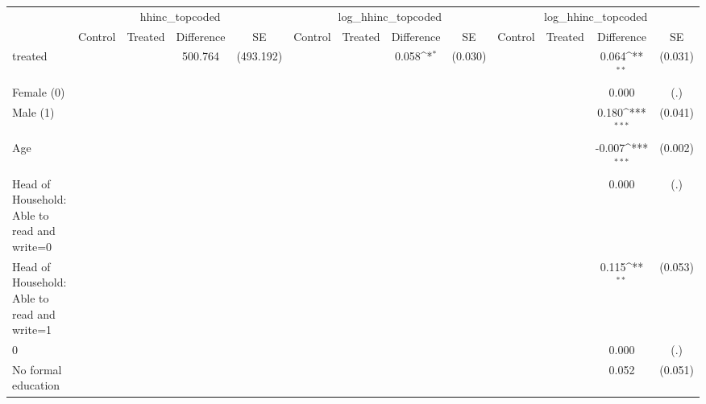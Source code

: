 {
\def\sym#1{\ifmmode^{#1}\else\(^{#1}\)\fi}
\begin{tabular}{l*{3}{cccc}}
\hline\hline
                    &\multicolumn{4}{c}{hhinc\_topcoded}                          &\multicolumn{4}{c}{log\_hhinc\_topcoded}                      &\multicolumn{4}{c}{log\_hhinc\_topcoded}                      \\
                    &     Control&     Treated&  Difference         &          SE&     Control&     Treated&  Difference         &          SE&     Control&     Treated&  Difference         &          SE\\
\hline
treated             &            &            &     500.764         &   (493.192)&            &            &       0.058\sym{*}  &     (0.030)&            &            &       0.064\sym{**} &     (0.031)\\
Female (0)          &            &            &                     &            &            &            &                     &            &            &            &       0.000         &         (.)\\
Male (1)            &            &            &                     &            &            &            &                     &            &            &            &       0.180\sym{***}&     (0.041)\\
Age                 &            &            &                     &            &            &            &                     &            &            &            &      -0.007\sym{***}&     (0.002)\\
Head of Household: Able to read and write=0&            &            &                     &            &            &            &                     &            &            &            &       0.000         &         (.)\\
Head of Household: Able to read and write=1&            &            &                     &            &            &            &                     &            &            &            &       0.115\sym{**} &     (0.053)\\
0                   &            &            &                     &            &            &            &                     &            &            &            &       0.000         &         (.)\\
No formal education &            &            &                     &            &            &            &                     &            &            &            &       0.052         &     (0.051)\\

\end{tabular}}
